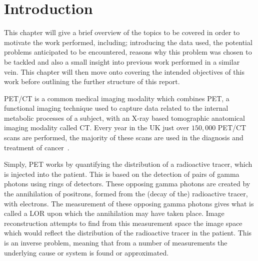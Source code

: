 \chapter{Introduction} \label{sec:introduction}
    This chapter will give a brief overview of the topics to be covered in order to motivate the work performed, including; introducing the data used, the potential problems anticipated to be encountered, reasons why this problem was chosen to be tackled and also a small insight into previous work performed in a similar vein. This chapter will then move onto covering the intended objectives of this work before outlining the further structure of this report.
    
        \gls{PET}/\gls{CT} is a common medical imaging modality which combines \gls{PET}, a functional imaging technique used to capture data related to the internal metabolic processes of a subject, with an X-ray based tomographic anatomical imaging modality called \gls{CT}. Every year in the UK just over $150,000$ \gls{PET}/\gls{CT} scans are performed, the majority of these scans are used in the diagnosis and treatment of cancer~.
    
        Simply, \gls{PET} works by quantifying the distribution of a radioactive tracer, which is injected into the patient. This is based on the detection of pairs of gamma photons using rings of detectors. These opposing gamma photons are created by the annihilation of positrons, formed from the (decay of the) radioactive tracer, with electrons. The measurement of these opposing gamma photons gives what is called a \gls{LOR} upon which the annihilation may have taken place. Image reconstruction attempts to find from this measurement space the image space which would reflect the distribution of the radioactive tracer in the patient. This is an inverse problem, meaning that from a number of measurements the underlying cause or system is found or approximated.
            
